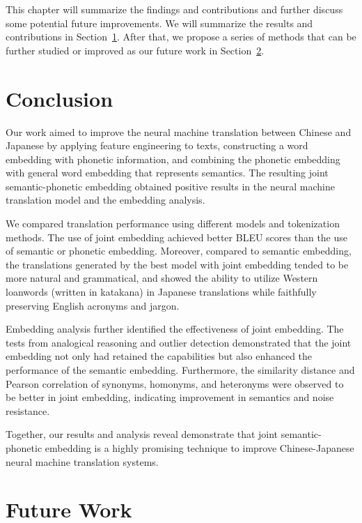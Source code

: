 \hspace{24pt}

This chapter will summarize the findings and contributions and further discuss some potential future improvements.  We will summarize the results and contributions in Section~\ref{sec:conclusion}. After that, we propose a series of methods that can be further studied or improved as our future work in Section~\ref{sec:future_work}.

\section{Conclusion} \label{sec:conclusion}

Our work aimed to improve the neural machine translation between Chinese and Japanese by applying feature engineering to texts, constructing a word embedding with phonetic information, and combining the phonetic embedding with general word embedding that represents semantics. The resulting joint semantic-phonetic embedding obtained positive results in the neural machine translation model and the embedding analysis. 

We compared translation performance using different models and tokenization methods.
The use of joint embedding achieved better BLEU scores than the use of semantic or phonetic embedding.
Moreover, compared to semantic embedding, the translations generated by the best model with joint embedding tended to be more natural and grammatical, and showed the ability to utilize Western loanwords (written in katakana) in Japanese translations while faithfully preserving English acronyms and jargon.

Embedding analysis further identified the effectiveness of joint embedding. The tests from analogical reasoning and outlier detection demonstrated that the joint embedding not only had retained the capabilities but also enhanced the performance of the semantic embedding. Furthermore, the similarity distance and Pearson correlation of synonyms, homonyms, and heteronyms were observed to be better in joint embedding, indicating improvement in semantics and noise resistance.

Together, our results and analysis reveal demonstrate that joint semantic-phonetic embedding is a highly promising technique to improve Chinese-Japanese neural machine translation systems.

\section{Future Work} \label{sec:future_work}

